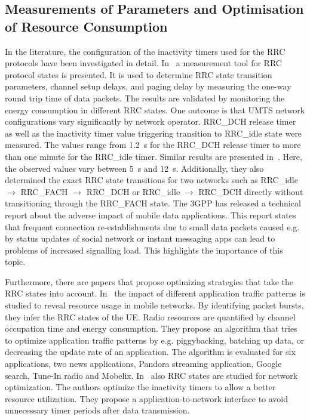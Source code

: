 \subsection{Measurements of  Parameters and Optimisation of Resource Consumption}\label{sec:network:background:measurement_optimisation}

In the literature, the configuration of the inactivity timers used for the \gls{RRC} protocols have been investigated in detail.
In~\cite{Perala2009} a measurement tool for \gls{RRC} protocol states is presented. 
It is used to determine \gls{RRC} state transition parameters, channel setup delays, and paging delay by measuring the one-way round trip time of data packets.
The results are validated by monitoring the energy consumption in different \gls{RRC} states.
One outcome is that \gls{UMTS} network configurations vary significantly by network operator.
\gls{RRC_DCH} release timer as well as the inactivity timer value triggering transition to \gls{RRC_idle} state were measured.
The values range from \SI{1.2}{\second} for the \gls{RRC_DCH} release timer to more than one minute for the \gls{RRC_idle} timer.
Similar results are presented in~\cite{Qian2010a}.
Here, the observed values vary between \SI{5}{\second} and \SI{12}{\second}. 
Additionally, they also determined the exact \gls{RRC} state transitions for two networks such as \gls{RRC_idle} \(\rightarrow\) \gls{RRC_FACH} \(\rightarrow\) \gls{RRC_DCH} or \gls{RRC_idle} \(\rightarrow\) \gls{RRC_DCH} directly without transitioning through the \gls{RRC_FACH} state.
The \gls{3GPP} has released a technical report \cite{3GPP_22801} about the adverse impact of mobile data applications.
This report states that frequent connection re-establishments due to small data packets caused e.g. by status updates of social network or instant messaging apps can lead to problems of increased signalling load.
This highlights the importance of this topic.

Furthermore, there are papers that propose optimizing strategies that take the \gls{RRC} states into account. 
In~\cite{Qian2011} the impact of different application traffic patterns is studied to reveal resource usage in mobile networks.
By identifying packet bursts, they infer the \gls{RRC} states of the \gls{UE}.
Radio resources are quantified by channel occupation time and energy consumption.
They propose an algorithm that tries to optimize application traffic patterns by e.g. piggybacking, batching up data, or decreasing the update rate of an application.
The algorithm is evaluated for six applications, two news applications, Pandora streaming application, Google search, Tune-In radio and Mobelix. 
In~\cite{Qian2010b} also \gls{RRC} states are studied for network optimization.
The authors optimize the inactivity timers to allow a better resource utilization. 
They propose a application-to-network interface to avoid unnecessary timer periods after data transmission.

